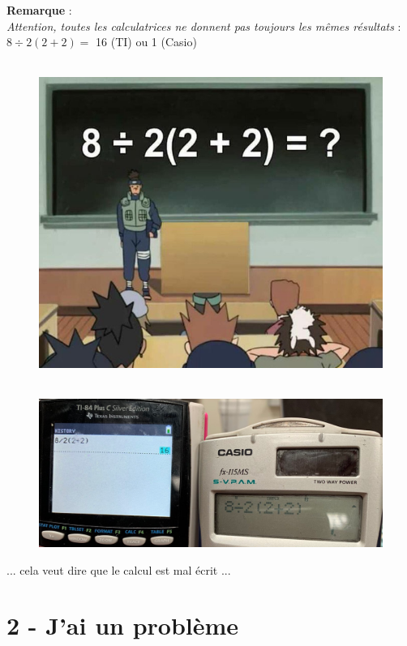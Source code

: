 \documentclass[11pt]{article}
\begin{document}
\textbf{Remarque} : \\
\textit{Attention, toutes les calculatrices ne donnent pas toujours les mêmes résultats} : $8 \div 2(2+2) =$ 16 (TI) ou 1 (Casio)

\begin{minipage}[t]{0.5\textwidth}
  \begin{figure}[H]
        \centering
        \includegraphics[width=0.7\linewidth]{3x1-calcul-algebrique-et-litteral/naruto.png}
  \end{figure}
\end{minipage}
\begin{minipage}[t]{0.5\textwidth}
  \begin{figure}[H]
        \centering
        \includegraphics[width=\linewidth]{3x1-calcul-algebrique-et-litteral/calc.png}
  \end{figure}
... cela veut dire que le calcul est mal écrit ...
\end{minipage}

\newpage

\section*{2 - J'ai un problème}
\end{document}
